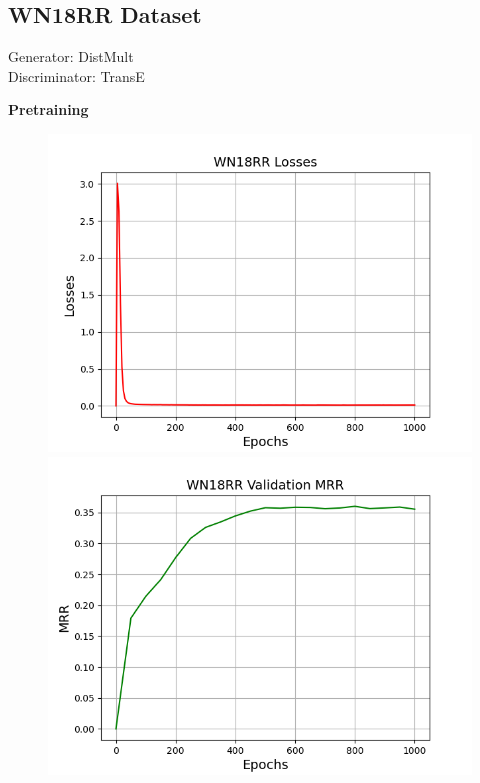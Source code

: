 \subsection{WN18RR Dataset}
Generator: DistMult\\
Discriminator: TransE

\textbf{Pretraining}\\
\begin{figure}
    \centering
    \begin{minipage}{.3\textwidth}
      \centering
      \includegraphics[width=0.9\linewidth]{figures/results/WN18RR/Pretraining/DistMult/pretrain_wn18rr_losses.png}
    \end{minipage}%
    \begin{minipage}{.3\textwidth}
      \centering
      \includegraphics[width=0.9\linewidth]{figures/results/WN18RR/Pretraining/DistMult/pretrain_wn18rr_mrr.png}

\end{minipage}
\end{figure}
